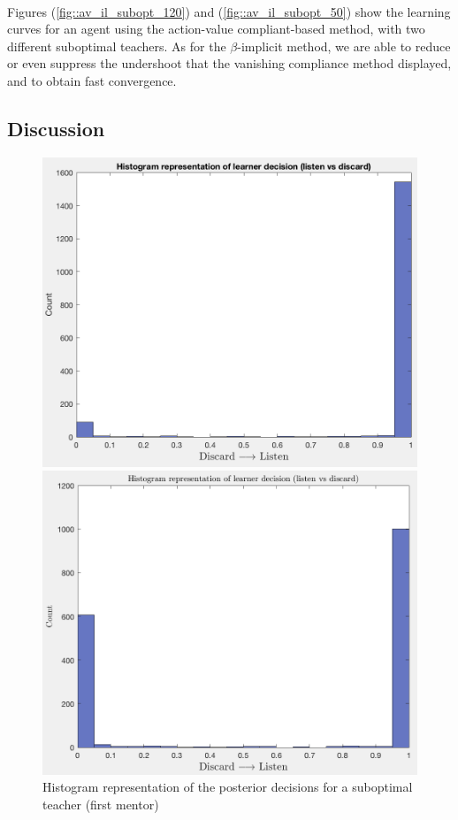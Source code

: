 \documentclass[a4paper]{report}
\begin{document}
{{{{				\paragraph{} Figures (\ref{fig::av_il_subopt_120}) and (\ref{fig::av_il_subopt_50}) show the learning curves for an agent using the action-value compliant-based method, with two different suboptimal teachers. As for the $\beta$-implicit method, we are able to reduce or even suppress the undershoot that the vanishing compliance method displayed, and to obtain fast convergence. 				
			}
			\subsection{Discussion}
			{		
				\begin{figure}[ht!]
					\begin{minipage}{0.45\linewidth}
						\begin{center}
							\includegraphics[width=0.9\linewidth]{pos_des_120}
							\caption{Histogram representation of the posterior decisions for a suboptimal teacher (first mentor)}
							\label{fig::post_des_120}
						\end{center}
					\end{minipage}
					\hfill
					\begin{minipage}{0.45\linewidth}
						\begin{center}
							\includegraphics[width=0.9\linewidth]{pos_des_50}

\end{center}
\end{minipage}
\end{figure}}}}}
\end{document}
